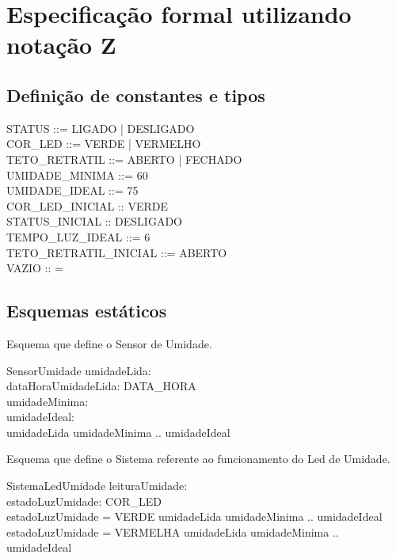     \section{Especificação formal utilizando notação Z}

        \subsection{Definição de constantes e tipos}

            \begin{zed}
                STATUS ::= LIGADO | DESLIGADO     \\
                COR\_LED ::= VERDE | VERMELHO     \\
                TETO\_RETRATIL ::= ABERTO | FECHADO \\    
                UMIDADE\_MINIMA ::= 60 \\
                UMIDADE\_IDEAL ::= 75 \\
                COR\_LED\_INICIAL :: VERDE \\
                STATUS\_INICIAL :: DESLIGADO \\
                TEMPO\_LUZ\_IDEAL ::= 6 \\
                TETO\_RETRATIL\_INICIAL ::= ABERTO \\
                VAZIO :: = \emptyset \\
                [DATA\_HORA]            
            \end{zed}                 


        \subsection{Esquemas estáticos}

            Esquema que define o Sensor de Umidade.
            \begin{schema}{SensorUmidade}
                umidadeLida: \nat\\
                dataHoraUmidadeLida: DATA\_HORA \\ 
                umidadeMinima: \nat \\
                umidadeIdeal: \nat \\            
            \where 
                umidadeLida \in umidadeMinima .. umidadeIdeal \\
            \end{schema}
            

            Esquema que define o Sistema referente ao funcionamento do Led de Umidade.
            \begin{schema}{SistemaLedUmidade}
                leituraUmidade: \nat \\ 
                estadoLuzUmidade: COR\_LED \\
            \where
                estadoLuzUmidade = VERDE \iff umidadeLida \in umidadeMinima .. umidadeIdeal \\
                estadoLuzUmidade = VERMELHA \iff umidadeLida \notin umidadeMinima .. umidadeIdeal \\
            \end{schema}
            

